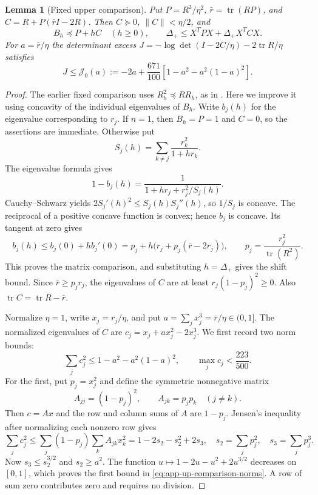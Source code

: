 \documentclass[11pt,a4paper]{article}
\numberwithin{equation}{section}
\newtheorem{lemma}[theorem]{Lemma}
\begin{document}
\begin{lemma}[Fixed upper comparison]\label{app:upper-logdet}
Put $P=R^2/\eta^2$, $\bar r=\operatorname{tr}(RP)$, and
$C=R+P(\bar rI-2R)$. Then $C\succeq0$, $\|C\|<\eta/2$, and
\begin{equation}\label{eq:app-up-fixed-comparison}
 B_h\preceq P+hC\quad(h\ge0),\qquad
 \Delta_+\le X^TPX+\Delta_+X^TCX.
\end{equation}
For $a=\bar r/\eta$ the determinant excess
$J=-\log\det(I-2C/\eta)-2\operatorname{tr}R/\eta$ satisfies
\[
 J\le\mathcal J_0(a):=-2a+\frac{671}{100}
                    [1-a^2-a^2(1-a)^2].
\]
\end{lemma}
\begin{proof}
The earlier fixed comparison uses $R_h^2\preceq RR_h$, as in
\cite[Section~7.4, equation~(7.3)]{youssef2013estimating}.
Here we improve it using concavity of the individual eigenvalues of $B_h$.
Write $b_j(h)$ for the eigenvalue corresponding to $r_j$.
If $n=1$, then $B_h=P=1$ and $C=0$, so the assertions are immediate.
Otherwise put
\[
 S_j(h)=\sum_{k\ne j}\frac{r_k^2}{1+hr_k}.
\]
The eigenvalue formula gives
\[
 1-b_j(h)=\frac1{1+hr_j+r_j^2/S_j(h)}.
\]
Cauchy--Schwarz yields $2S_j'(h)^2\le S_j(h)S_j''(h)$,
so $1/S_j$ is concave. The reciprocal of a positive concave function is
convex; hence $b_j$ is concave. Its tangent at zero gives
\[
 b_j(h)\le b_j(0)+hb_j'(0)
 =p_j+h\bigl(r_j+p_j(\bar r-2r_j)\bigr),
 \qquad p_j=\frac{r_j^2}{\operatorname{tr}(R^2)}.
\]
This proves the matrix comparison, and substituting $h=\Delta_+$ gives the shift bound. Since $\bar r\ge p_jr_j$,
the eigenvalues of $C$ are at least $r_j(1-p_j)^2\ge0$.
Also $\operatorname{tr}C=\operatorname{tr}R-\bar r$.

Normalize $\eta=1$, write $x_j=r_j/\eta$, and put
$a=\sum_jx_j^3=\bar r/\eta\in(0,1]$.
The normalized eigenvalues of $C$ are
$c_j=x_j+ax_j^2-2x_j^3$.
We first record two norm bounds:
\begin{equation}\label{eq:app-up-comparison-norms}
 \sum_jc_j^2\le1-a^2-a^2(1-a)^2,
 \qquad \max_jc_j<\frac{223}{500}.
\end{equation}
For the first, put $p_j=x_j^2$ and define the symmetric nonnegative matrix
\[
 A_{jj}=(1-p_j)^2,\qquad A_{jk}=p_jp_k\quad(j\ne k).
\]
Then $c=Ax$ and the row and column sums of $A$ are $1-p_j$.
Jensen's inequality after normalizing each nonzero row gives
\[
 \sum_jc_j^2
 \le\sum_j(1-p_j)\sum_k A_{jk}x_k^2
 =1-2s_2-s_2^2+2s_3,
 \quad s_2=\sum_jp_j^2,\quad s_3=\sum_jp_j^3.
\]
Now $s_3\le s_2^{3/2}$ and $s_2\ge a^2$.
The function $u\mapsto1-2u-u^2+2u^{3/2}$ decreases on $[0,1]$,
which proves the first bound in \eqref{eq:app-up-comparison-norms}.
A row of sum zero contributes zero and requires no division.


\end{proof}
\end{document}
